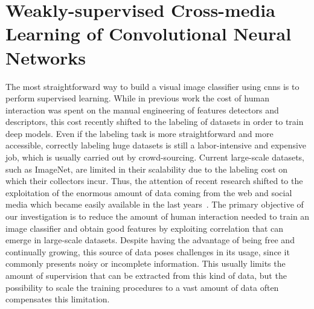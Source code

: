 
\graphicspath{{img/vsa/}}

\newcommand{\BTSA}{B-T4SA}
\newcommand{\ourFtAlex}{Hybrid-T4SA}
\newcommand{\ourFtVGG}{VGG-T4SA}

\chapter{Weakly-supervised Cross-media Learning of Convolutional Neural Networks}
\label{ch:cross-media}

The most straightforward way to build a visual image classifier using \glspl{cnn} is to perform supervised learning.
While in previous work the cost of human interaction was spent on the manual engineering of features detectors and descriptors, this cost recently shifted to the labeling of datasets in order to train deep models.
Even if the labeling task is more straightforward and more accessible, correctly labeling huge datasets is still a labor-intensive and expensive job, which is usually carried out by crowd-sourcing.
Current large-scale datasets, such as ImageNet, are limited in their scalability due to the labeling cost on which their collectors incur.
Thus, the attention of recent research shifted to the exploitation of the enormous amount of data coming from the web and social media which became easily available in the last years~\cite{sun2017revisiting,mahajan2018exploring}.
The primary objective of our investigation is to reduce the amount of human interaction needed to train an image classifier and obtain good features by exploiting correlation that can emerge in large-scale datasets.
Despite having the advantage of being free and continually growing, this source of data poses challenges in its usage, since it commonly presents noisy or incomplete information.
This usually limits the amount of supervision that can be extracted from this kind of data, but the possibility to scale the training procedures to a vast amount of data often compensates this limitation.

